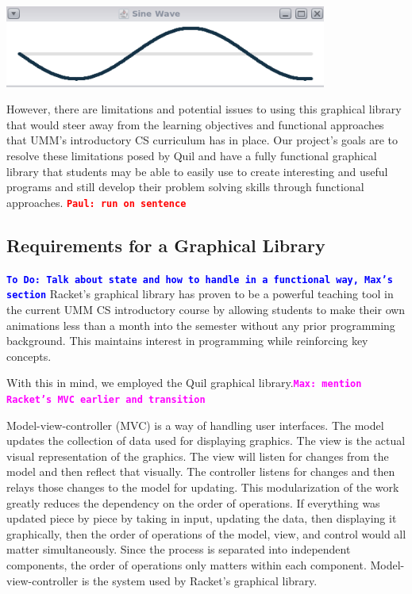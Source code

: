 \documentclass[12pt]{article}
\newcommand{\comment}[1]{{\bf \tt  {#1}}}
\newcommand{\todo}[1]{\textcolor{blue}{\comment{To Do: {#1}}}}
\newcommand{\pscomment}[1]{\textcolor{red}{\comment{Paul: {#1}}}}
\newcommand{\mmcomment}[1]{\textcolor{magenta}{\comment{Max: {#1}}}}
\begin{document}
\begin{center}
\includegraphics[width=300pt]{sine-wave}
\end{center}

However, there are limitations and potential issues to using this graphical library that would steer away from the learning objectives and functional approaches that UMM's introductory CS curriculum has in place. Our project's goals are to resolve these limitations posed by Quil and have a fully functional graphical library that students may be able to easily use to create interesting and useful programs and still develop their problem solving skills through functional approaches. \pscomment{run on sentence}


\subsection{Requirements for a Graphical Library}\label{subsec:requirements}
\todo{Talk about state and how to handle in a functional way, Max's section}
Racket's graphical library has proven to be a powerful teaching tool in the current UMM CS introductory course by allowing students to make their own animations less than a month into the semester without any prior programming background. This maintains interest in programming while reinforcing key concepts. 

With this in mind, we employed the Quil graphical library.\mmcomment{mention Racket's MVC earlier and transition}

Model-view-controller (MVC) is a way of handling user interfaces. The model updates the collection of data used for displaying graphics. The view is the actual visual representation of the graphics. The view will listen for changes from the model and then reflect that visually. The controller listens for changes and then relays those changes to the model for updating. This modularization of the work greatly reduces the dependency on the order of operations. If everything was updated piece by piece by taking in input, updating the data, then displaying it graphically, then the order of operations of the model, view, and control would all matter simultaneously. Since the process is separated into independent components, the order of operations only matters within each component. Model-view-controller is the system used by Racket's graphical library.
\end{document}
